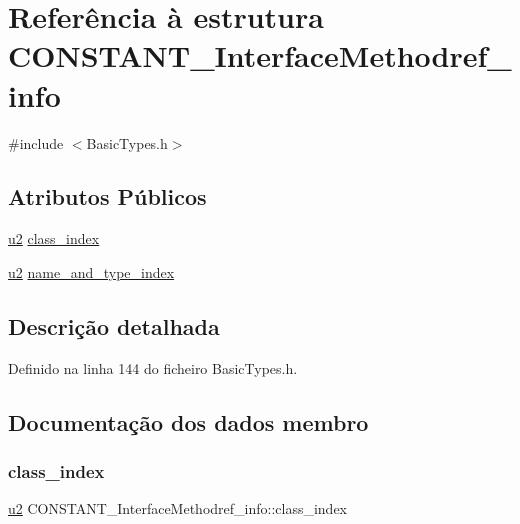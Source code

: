 \hypertarget{structCONSTANT__InterfaceMethodref__info}{}\section{Referência à estrutura C\+O\+N\+S\+T\+A\+N\+T\+\_\+\+Interface\+Methodref\+\_\+info}
\label{structCONSTANT__InterfaceMethodref__info}


{\ttfamily \#include $<$Basic\+Types.\+h$>$}

\subsection*{Atributos Públicos}
\begin{DoxyCompactItemize}
\item 
\hyperlink{BasicTypes_8h_a732cde1300aafb73b0ea6c2558a7a54f}{u2} \hyperlink{structCONSTANT__InterfaceMethodref__info_a0a7a6dd9207dec5f681a566a65276f66}{class\+\_\+index}
\item 
\hyperlink{BasicTypes_8h_a732cde1300aafb73b0ea6c2558a7a54f}{u2} \hyperlink{structCONSTANT__InterfaceMethodref__info_aeeb0a97e077fcbd839a67d7bb3ac6d5b}{name\+\_\+and\+\_\+type\+\_\+index}
\end{DoxyCompactItemize}


\subsection{Descrição detalhada}


Definido na linha 144 do ficheiro Basic\+Types.\+h.



\subsection{Documentação dos dados membro}
\mbox{\label{structCONSTANT__InterfaceMethodref__info_a0a7a6dd9207dec5f681a566a65276f66}} 
\subsubsection{\texorpdfstring{class\+\_\+index}{class\_index}}
{\footnotesize\ttfamily \hyperlink{BasicTypes_8h_a732cde1300aafb73b0ea6c2558a7a54f}{u2} C\+O\+N\+S\+T\+A\+N\+T\+\_\+\+Interface\+Methodref\+\_\+info\+::class\+\_\+index}



